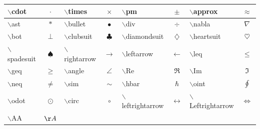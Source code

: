 \documentclass[a4paper,12pt,twoside]{article}
\begin{document}
\begin{tabular}{|l|c|l|c|l|c|l|c|}
$\backslash$cdot&$\cdot$&$\backslash$times& $\times$ &
$\backslash$pm&$\pm$&$\backslash$approx& $\approx$ \\
\hline

$\backslash$ast&$\ast$&$\backslash$bullet& $\bullet$ &
$\backslash$div&$\div$&$\backslash$nabla& $\nabla$ \\
\hline

$\backslash$bot&$\bot$&$\backslash$clubsuit& $\clubsuit$ &
$\backslash$diamondsuit&$\diamondsuit$&$\backslash$heartsuit& $\heartsuit$ \\
\hline

$\backslash$spadesuit&$\spadesuit$&$\backslash$rightarrow& $\rightarrow$&
$\backslash$leftarrow&$\leftarrow$&$\backslash$leq& $\leq$ \\
\hline

$\backslash$geq&$\geq$&$\backslash$angle& $\angle$ &
$\backslash$Re&$\Re$&$\backslash$Im& $\Im$ \\
\hline

$\backslash$neq&$\neq$&$\backslash$sim& $\sim$ &
$\backslash$hbar&$\hbar$&$\backslash$oint& $\oint$ \\
\hline

$\backslash$odot&$\odot$&$\backslash$circ& $\circ$ &
$\backslash$leftrightarrow&$\leftrightarrow$&$\backslash$Leftrightarrow& $\Leftrightarrow$ \\
\hline

$\backslash$AA&$\AA$&  & & & & &\\
\hline
\end{tabular}
\end{document}
